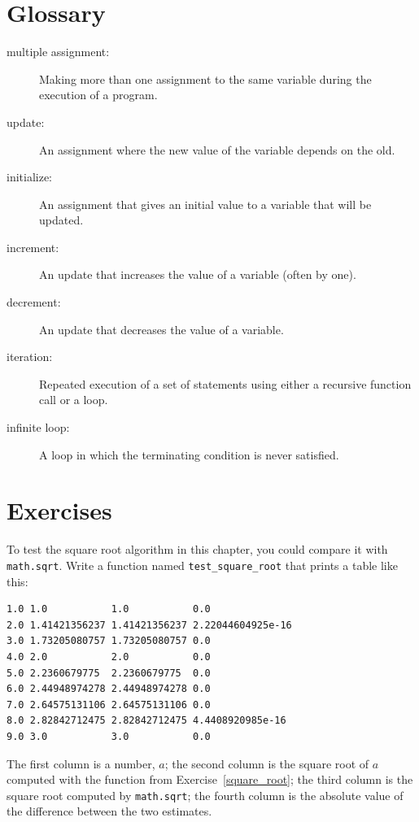 \documentclass[10pt]{book}
\begin{document}
\section{Glossary}

\begin{description}

\item[multiple assignment:] Making more than one assignment to the same
variable during the execution of a program.

\item[update:] An assignment where the new value of the variable
depends on the old.

\item[initialize:] An assignment that gives an initial value to
a variable that will be updated.

\item[increment:] An update that increases the value of a variable
(often by one).

\item[decrement:] An update that decreases the value of a variable.

\item[iteration:] Repeated execution of a set of statements using
either a recursive function call or a loop.

\item[infinite loop:] A loop in which the terminating condition is
never satisfied.

\end{description}


\section{Exercises}

\begin{ex}


To test the square root algorithm in this chapter, you could compare
it with {\tt math.sqrt}.  Write a function named \verb"test_square_root"
that prints a table like this:

\beforeverb
\begin{verbatim}
1.0 1.0           1.0           0.0
2.0 1.41421356237 1.41421356237 2.22044604925e-16
3.0 1.73205080757 1.73205080757 0.0
4.0 2.0           2.0           0.0
5.0 2.2360679775  2.2360679775  0.0
6.0 2.44948974278 2.44948974278 0.0
7.0 2.64575131106 2.64575131106 0.0
8.0 2.82842712475 2.82842712475 4.4408920985e-16
9.0 3.0           3.0           0.0

\end{verbatim}
\afterverb
%
The first column is a number, $a$; the second column is
the square root of $a$ computed with the function from
Exercise~\ref{square_root}; the third column is the square root computed
by {\tt math.sqrt}; the fourth column is the absolute value
of the difference between the two estimates.
\end{ex}
\end{document}
